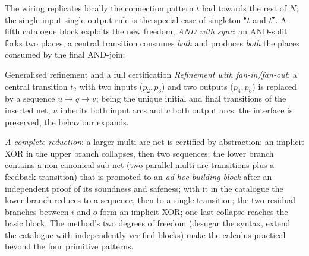 The wiring replicates locally the connection pattern $t$ had towards the rest of $N$; the single-input-single-output rule is the special case of singleton ${}^\bullet t$ and $t^\bullet$. A fifth catalogue block exploits the new freedom, \emph{AND with sync}: an AND-split forks two places, a central transition consumes \emph{both} and produces \emph{both} the places consumed by the final AND-join:
\begin{center}
\end{center}

\begin{examplebox}{Generalised refinement and a full certification}
\emph{Refinement with fan-in/fan-out}: a central transition $t_2$ with two inputs ($p_2, p_3$) and two outputs ($p_4, p_5$) is replaced by a sequence $u \to q \to v$; being the unique initial and final transitions of the inserted net, $u$ inherits both input arcs and $v$ both output arcs: the interface is preserved, the behaviour expands.
\par\smallskip
\emph{A complete reduction}: a larger multi-arc net is certified by abstraction: an implicit XOR in the upper branch collapses, then two sequences; the lower branch contains a non-canonical sub-net (two parallel multi-arc transitions plus a feedback transition) that is promoted to an \emph{ad-hoc building block} after an independent proof of its soundness and safeness; with it in the catalogue the lower branch reduces to a sequence, then to a single transition; the two residual branches between $i$ and $o$ form an implicit XOR; one last collapse reaches the basic block. The method's two degrees of freedom (desugar the syntax, extend the catalogue with independently verified blocks) make the calculus practical beyond the four primitive patterns.
\end{examplebox}
